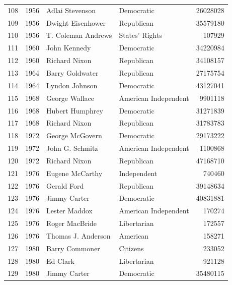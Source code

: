 \documentclass[
  letterpaper,
  DIV=11,
  numbers=noendperiod]{scrreprt}
\begin{document}
\begin{tabular}{lrllr}
108 &  1956 &         Adlai Stevenson &             Democratic &      26028028 \\
109 &  1956 &       Dwight Eisenhower &             Republican &      35579180 \\
110 &  1956 &      T. Coleman Andrews &         States' Rights &        107929 \\
111 &  1960 &            John Kennedy &             Democratic &      34220984 \\
112 &  1960 &           Richard Nixon &             Republican &      34108157 \\
113 &  1964 &         Barry Goldwater &             Republican &      27175754 \\
114 &  1964 &          Lyndon Johnson &             Democratic &      43127041 \\
115 &  1968 &          George Wallace &   American Independent &       9901118 \\
116 &  1968 &         Hubert Humphrey &             Democratic &      31271839 \\
117 &  1968 &           Richard Nixon &             Republican &      31783783 \\
118 &  1972 &         George McGovern &             Democratic &      29173222 \\
119 &  1972 &         John G. Schmitz &   American Independent &       1100868 \\
120 &  1972 &           Richard Nixon &             Republican &      47168710 \\
121 &  1976 &         Eugene McCarthy &            Independent &        740460 \\
122 &  1976 &             Gerald Ford &             Republican &      39148634 \\
123 &  1976 &            Jimmy Carter &             Democratic &      40831881 \\
124 &  1976 &           Lester Maddox &   American Independent &        170274 \\
125 &  1976 &          Roger MacBride &            Libertarian &        172557 \\
126 &  1976 &      Thomas J. Anderson &               American &        158271 \\
127 &  1980 &          Barry Commoner &               Citizens &        233052 \\
128 &  1980 &                Ed Clark &            Libertarian &        921128 \\
129 &  1980 &            Jimmy Carter &             Democratic &      35480115 \\

\end{tabular}
\end{document}
